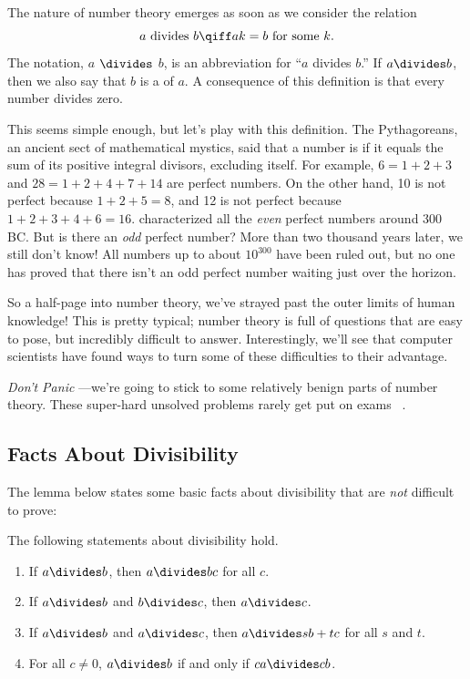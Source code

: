 The nature of number theory emerges as soon as we consider the
 relation
\[
a \text{ divides } b \qiff ak = b \text{ for some } k.
\]
The notation, $a$ $\divides$ $b$,
is an abbreviation for ``$a$ divides $b$.''  If $a \divides b$, then
we also say that $b$ is a  of $a$.  A consequence of
this definition is that every number divides zero.

This seems simple enough, but let's play with this definition.  The
Pythagoreans, an ancient sect of mathematical mystics, said that a number
is  if it equals the sum of its
positive integral divisors, excluding itself.  For example, $6 = 1 + 2 +
3$ and $28 = 1 + 2 + 4 + 7 + 14$ are perfect numbers.  On the other hand,
10 is not perfect because $1 + 2 + 5 = 8$, and 12 is not perfect because
$1 + 2 + 3 + 4 + 6 = 16$.   characterized all the \emph{even}
perfect numbers around 300 BC.  But is there an \emph{odd} perfect number?
More than two thousand years later, we still don't know!  All numbers up
to about $10^{300}$ have been ruled out, but no one has proved that there
isn't an odd perfect number waiting just over the horizon.

So a half-page into number theory, we've strayed past the outer limits
of human knowledge!  This is pretty typical; number theory is full of
questions that are easy to pose, but incredibly difficult to answer.
Interestingly, we'll see that computer scientists have found ways to
turn some of these difficulties to their advantage.

\emph{Don't Panic} ---we're going to stick to some relatively benign parts
of number theory.  These super-hard unsolved problems rarely get put
on exams \smiley\ .

\subsection{Facts About Divisibility}

The lemma below states some basic facts about divisibility that are
\emph{not} difficult to prove:

\begin{lemma}
\label{lem:div}
The following statements about divisibility hold.
%
\begin{enumerate}
\item If $a \divides b$, then $a \divides bc$ for all $c$.
\item If $a \divides b$ and $b \divides c$, then $a \divides c$.

\item\label{lem:divsbtc} If $a \divides b$ and $a \divides c$,
then $a \divides sb + tc$ for all $s$ and $t$.

\item For all $c \neq 0$, $a \divides b$ if and only if $ca \divides cb$.
\end{enumerate}
\end{lemma}

